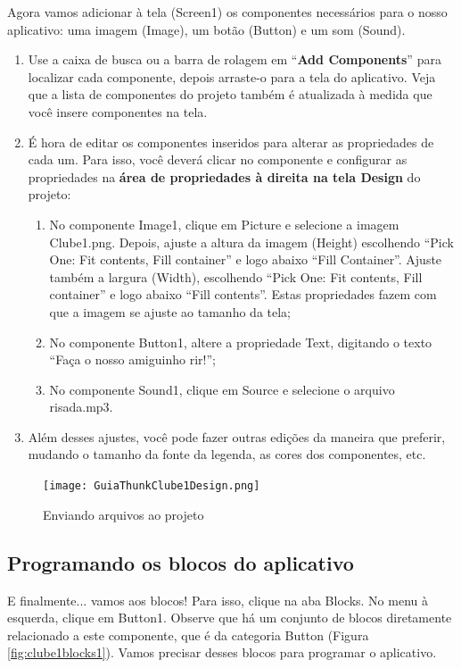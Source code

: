 \documentclass[11pt,fleqn]{book} %
\begin{document}
Agora vamos adicionar à tela (Screen1) os componentes necessários para o nosso aplicativo: uma imagem (Image), um botão (Button) e um som (Sound). 
\begin{enumerate}
\item Use a caixa de busca ou a barra de rolagem em ``\textbf{Add Components}'' para localizar cada componente, depois arraste-o para a tela do aplicativo. Veja que a lista de componentes do projeto também é atualizada à medida que você insere componentes na tela.
\item É hora de editar os componentes inseridos para alterar as propriedades de cada um. Para isso, você deverá clicar no componente e configurar as propriedades na \textbf{área de propriedades à direita na tela Design} do projeto:

	\begin{enumerate}[label=(\alph*)]
    	\item No componente Image1, clique em Picture e selecione a imagem Clube1.png. Depois, ajuste a altura da imagem (Height) escolhendo ``Pick One: Fit contents, Fill container'' e logo abaixo ``Fill Container''. Ajuste também a largura (Width), escolhendo ``Pick One: Fit contents, Fill container'' e logo abaixo ``Fill contents''. Estas propriedades fazem com que a imagem se ajuste ao tamanho da tela;
    	\item No componente Button1, altere a propriedade Text, digitando o texto ``Faça o nosso amiguinho rir!'';
    	\item No componente Sound1, clique em Source e selecione o arquivo risada.mp3.


	\end{enumerate} 

\item Além desses ajustes, você pode fazer outras edições da maneira que preferir, mudando o tamanho da fonte da legenda, as cores dos componentes, etc.
\end{enumerate}

\begin{figure}[H]
 	\centering   
	\texttt{[image: GuiaThunkClube1Design.png]}
    \caption{Enviando arquivos ao projeto}\label{fig:clube1design}
\end{figure}
	
	
\subsection{Programando os blocos do aplicativo}


E finalmente... vamos aos blocos! Para isso, clique na aba Blocks. No menu à esquerda, clique em Button1. Observe que há um conjunto de blocos diretamente relacionado a este componente, que é da categoria Button (Figura \ref{fig:clube1blocks1}). Vamos precisar desses blocos para programar o aplicativo.
\end{document}
